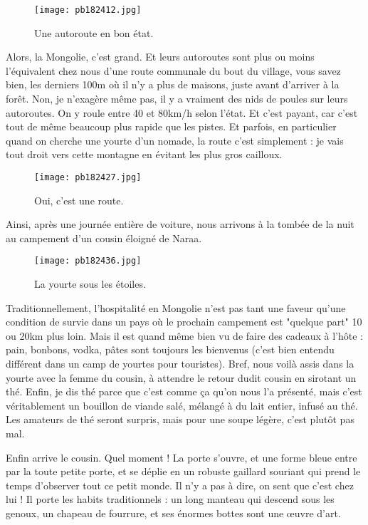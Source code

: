 \documentclass{book}
\begin{document}
\begin{figure}[h]
\centering
\texttt{[image: pb182412.jpg]}
\caption*{ Une autoroute en bon état.}
\end{figure}

Alors, la Mongolie, c'est grand. Et leurs autoroutes sont plus ou moins l'équivalent chez nous d'une route communale du bout du village, vous savez bien, les derniers 100m où il n'y a plus de maisons, juste avant d'arriver à la forêt. Non, je n'exagère même pas, il y a vraiment des nids de poules sur leurs autoroutes. On y roule entre 40 et 80km/h selon l'état. Et c'est payant, car c'est tout de même beaucoup plus rapide que les pistes. Et parfois, en particulier quand on cherche une yourte d'un nomade, la route c'est simplement : je vais tout droit vers cette montagne en évitant les plus gros cailloux.


\begin{figure}[h]
\centering
\texttt{[image: pb182427.jpg]}
\caption*{ Oui, c'est une route.}
\end{figure}

Ainsi, après une journée entière de voiture, nous arrivons à la tombée de la nuit au campement d'un cousin éloigné de Naraa.


\begin{figure}[h]
\centering
\texttt{[image: pb182436.jpg]}
\caption*{ La yourte sous les étoiles.}
\end{figure}

Traditionnellement, l'hospitalité en Mongolie n'est pas tant une faveur qu'une condition de survie dans un pays où le prochain campement est "quelque part" 10 ou 20km plus loin. Mais il est quand même bien vu de faire des cadeaux à l'hôte : pain, bonbons, vodka, pâtes sont toujours les bienvenus (c'est bien entendu différent dans un camp de yourtes pour touristes). Bref, nous voilà assis dans la yourte avec la femme du cousin, à attendre le retour dudit cousin en sirotant un thé. Enfin, je dis thé parce que c'est comme ça qu'on nous l'a présenté, mais c'est véritablement un bouillon de viande salé, mélangé à du lait entier, infusé au thé. Les amateurs de thé seront surpris, mais pour une soupe légère, c'est plutôt pas mal.

Enfin arrive le cousin. Quel moment ! La porte s'ouvre, et une forme bleue entre par la toute petite porte, et se déplie en un robuste gaillard souriant qui prend le temps d'observer tout ce petit monde. Il n'y a pas à dire, on sent que c'est chez lui ! Il porte les habits traditionnels : un long manteau qui descend sous les genoux, un chapeau de fourrure, et ses énormes bottes sont une œuvre d'art.
\end{document}
